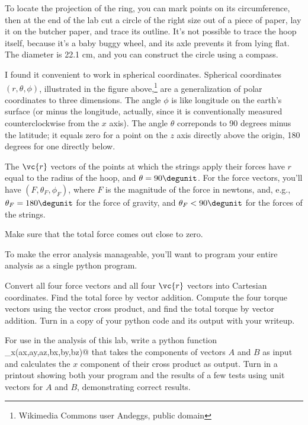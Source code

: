 To locate the projection of the ring, you can mark points on its circumference, then at the end of the lab cut a circle of the right
size out of a piece of paper, lay it on the butcher paper, and trace its outline. It's not possible to trace the hoop itself, because
it's a baby buggy wheel, and its axle prevents it from lying flat. The diameter is 22.1 cm, and you can construct the circle using
a compass.


I found it convenient to work in spherical coordinates. Spherical coordinates $(r,\theta,\phi)$, illustrated in the figure above,\footnote{Wikimedia Commons user Andeggs, public domain} %
are a generalization of polar coordinates to three dimensions. The angle $\phi$ is like longitude on the earth's surface
(or minus the longitude, actually, since it is conventionally measured counterclockwise from the $x$ axis).
The angle $\theta$ correponds to 90 degrees minus the latitude; it equals zero for a point on the $z$ axis directly above the origin, 180 degrees
for one directly below.

The $\vc{r}$ vectors of the points
at which the strings apply their forces have $r$ equal to the radius of the hoop, and $\theta=90 \degunit$. For the force vectors,
you'll have $(F,\theta_F,\phi_F)$, where $F$ is the magnitude of the force in newtons, and, e.g., $\theta_F=180\degunit$ for the
force of gravity, and $\theta_F<90\degunit$ for the forces of the strings.

\selfcheck

Make sure that the total force comes out close to zero.

\analysis

To make the error analysis manageable, you'll want to program your entire analysis as a single python program.

Convert all four force vectors and all four $\vc{r}$ vectors into Cartesian coordinates. Find the total force by vector addition.
Compute the four torque vectors using the vector cross product, and find the total torque by vector addition.
Turn in a copy of your python code and its output with your writeup. 

\prelab

\prelabquestion For use in the analysis of this lab, write a python function \verb@cross_x(ax,ay,az,bx,by,bz)@ that
takes the components of vectors $A$ and $B$ as input and calculates the $x$ component of their cross product as output.
Turn in a printout showing both your program and the results of a few tests using unit vectors for $A$ and $B$,
demonstrating correct results.


